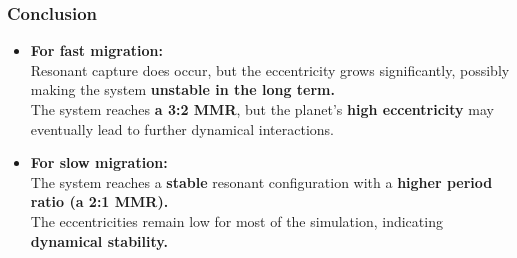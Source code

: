 \documentclass[12pt,a4paper]{article}
\begin{document}
\subsubsection{Conclusion}
\begin{itemize}
    \item \textbf{For fast migration:}
    \\ Resonant capture does occur, but the eccentricity grows significantly, possibly making the system \textbf{unstable in the long term.} 
    \\ The system reaches \textbf{a 3:2 MMR}, but the planet’s \textbf{high eccentricity} may eventually lead to further dynamical interactions.
    \item \textbf{For slow migration:}
    \\ The system reaches a \textbf{stable} resonant configuration with a \textbf{higher period ratio (a 2:1 MMR).}
    \\ The eccentricities remain low for most of the simulation, indicating \textbf{dynamical stability.}
\end{itemize}





\end{document}
